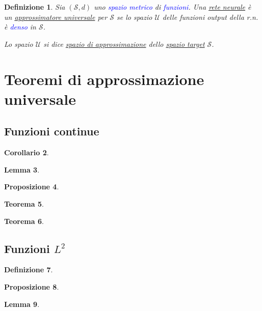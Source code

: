 \documentclass[10pt]{book}
\newcommand{\1}{\mathds{1}}
\theoremstyle{definition}%
\newtheorem{thm}{Teorema}[section]
\newtheorem{lem}[thm]{Lemma}
\newtheorem{prop}[thm]{Proposizione}
\newtheorem{cor}[thm]{Corollario}
\theoremstyle{plain}
\newtheorem{definizione}[thm]{Definizione}
\theoremstyle{remark}
\renewcommand{\href}[2]{\textcolor{blue}{#2}}
\begin{document}
\begin{definizione}
Sia \((\mathcal{S}, d)\) uno \href{../../../../../org/roam/20250301193511-spazio_metrico.org}{spazio metrico} di \href{../../../../../org/roam/20250202170607-classe_relazione_binaria.org}{funzioni}. Una \hyperref[sec:org3aeb766]{rete neurale} è un \uline{approssimatore universale} per \(\mathcal{S}\) se lo spazio \(\mathcal{U}\) delle funzioni output della r.n. è \href{../../../../../org/roam/20250301193045-sottoinsieme_denso.org}{denso} in \(\mathcal{S}\).

Lo spazio \(\mathcal{U}\) si dice \uline{spazio di approssimazione} dello \uline{spazio target} \(\mathcal{S}\).
\end{definizione}
\section{Teoremi di approssimazione universale}
\label{sec:orgedb5602}

\subsection{Funzioni continue}
\label{sec:org74ef143}

\begin{cor}
\lipsum[2]
\label{lem:9.3.2}
\end{cor}
\begin{lem}
\lipsum[1]
\label{lem:9.3.3}
\end{lem}

\begin{prop}
\lipsum[1]
\label{prop9.3.5}
\end{prop}

\begin{thm}
\lipsum[1]
\label{teo9.3.6}
\end{thm}

\begin{thm}
\lipsum[1]
\label{teo9.3.6}
\end{thm}
\subsection{Funzioni \(L^{2}\)}
\label{sec:org4b65aa5}

\begin{definizione}
\lipsum[1]
\label{def9.3.10}
\end{definizione}
\begin{prop}
\lipsum[1]
\label{prop9.3.11}
\end{prop}
\begin{lem}
\lipsum[1]
\label{lem9.3.12}
\end{lem}
\end{document}
